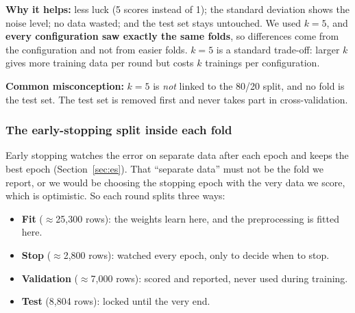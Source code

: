 \documentclass[11pt,a4paper]{article}
\begin{document}
\textbf{Why it helps:} less luck (5 scores instead of 1); the standard deviation shows the noise level; no data wasted;
and the test set stays untouched. We used $k = 5$, and \textbf{every configuration saw exactly the same folds}, so
differences come from the configuration and not from easier folds. $k = 5$ is a standard trade-off: larger $k$ gives
more training data per round but costs $k$ trainings per configuration.

\textbf{Common misconception:} $k = 5$ is \emph{not} linked to the 80/20 split, and no fold is the test set. The test set
is removed first and never takes part in cross-validation.

\subsubsection*{The early-stopping split inside each fold}
Early stopping watches the error on separate data after each epoch and keeps the best epoch (Section~\ref{sec:es}).
That ``separate data'' must not be the fold we report, or we would be choosing the stopping epoch with the very data we
score, which is optimistic. So each round splits three ways:

\begin{center}
\end{center}
\begin{itemize}
  \item \textbf{Fit} ($\approx$25{,}300 rows): the weights learn here, and the preprocessing is fitted here.
  \item \textbf{Stop} ($\approx$2{,}800 rows): watched every epoch, only to decide when to stop.
  \item \textbf{Validation} ($\approx$7{,}000 rows): scored and reported, never used during training.
  \item \textbf{Test} (8{,}804 rows): locked until the very end.
\end{itemize}
\end{document}
